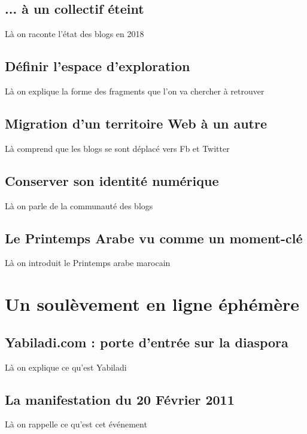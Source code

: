 \documentclass[symmetric,justified,marginals=raggedouter]{tufte-book}
\begin{document}
\subsection{... à un collectif éteint}

Là on raconte l'état des blogs en 2018

\subsection{Définir l'espace d'exploration}

Là on explique la forme des fragments que l'on va chercher à retrouver

\subsection{Migration d'un territoire Web à un autre}

Là comprend que les blogs se sont déplacé vers Fb et Twitter

\subsection{Conserver son identité numérique}

Là on parle de la communauté des blogs

\subsection{Le Printemps Arabe vu comme un moment-clé}

Là on introduit le Printemps arabe marocain 

\section{Un soulèvement en ligne éphémère}

\subsection{Yabiladi.com : porte d'entrée sur la diaspora}

Là on explique ce qu'est Yabiladi

\subsection{La manifestation du 20 Février 2011}

Là on rappelle ce qu'est cet événement
\end{document}
